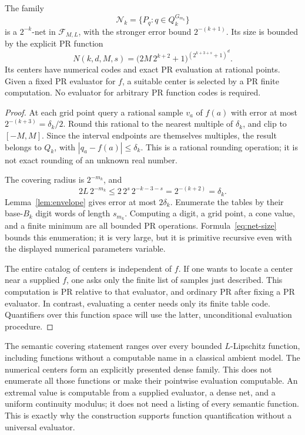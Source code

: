 \begin{theorem}\label{thm:function-net}
The family
\[
 \mathcal N_k=\{P_q:q\in Q_k^{G_{m_k}}\}
\]
is a \(2^{-k}\)-net in \(\mathcal F_{M,L}\), with the stronger error bound \(2^{-(k+1)}\). Its size is bounded by the explicit PR function
\begin{equation}
 N(k,d,M,s)=\bigl(2M\,2^{k+2}+1\bigr)^{(2^{k+3+s}+1)^d}.
 \label{eq:net-size}
\end{equation}
Its centers have numerical codes and exact PR evaluation at rational points. Given a fixed PR evaluator for \(f\), a suitable center is selected by a PR finite computation. No evaluator for arbitrary PR function codes is required.
\end{theorem}

\begin{proof}
At each grid point query a rational sample \(v_a\) of \(f(a)\) with error at most \(2^{-(k+3)}=\delta_k/2\). Round this rational to the nearest multiple of \(\delta_k\), and clip to \([-M,M]\). Since the interval endpoints are themselves multiples, the result belongs to \(Q_k\), with \(|q_a-f(a)|\leq\delta_k\). This is a rational rounding operation; it is not exact rounding of an unknown real number.

The covering radius is \(2^{-m_k}\), and
\[
 2L\,2^{-m_k}\leq2\,2^s\,2^{-k-3-s}=2^{-(k+2)}=\delta_k.
\]
Lemma~\ref{lem:envelope} gives error at most \(2\delta_k\). Enumerate the tables by their base-\(B_k\) digit words of length \(s_{m_k}\). Computing a digit, a grid point, a cone value, and a finite minimum are all bounded PR operations. Formula~\eqref{eq:net-size} bounds this enumeration; it is very large, but it is primitive recursive even with the displayed numerical parameters variable.

The entire catalog of centers is independent of \(f\). If one wants to locate a center near a supplied \(f\), one asks only the finite list of samples just described. This computation is PR relative to that evaluator, and ordinary PR after fixing a PR evaluator. In contrast, evaluating a center needs only its finite table code. Quantifiers over this function space will use the latter, unconditional evaluation procedure.
\end{proof}

\begin{remark}
The semantic covering statement ranges over every bounded \(L\)-Lipschitz function, including functions without a computable name in a classical ambient model. The numerical centers form an explicitly presented dense family. This does not enumerate all those functions or make their pointwise evaluation computable. An extremal value is computable from a supplied evaluator, a dense net, and a uniform continuity modulus; it does not need a listing of every semantic function. This is exactly why the construction supports function quantification without a universal evaluator.
\end{remark}


